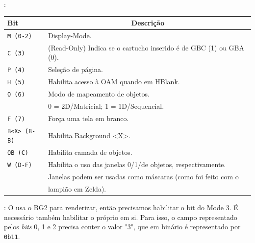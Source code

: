 \documentclass{beamer}
\let\emph\relax %
\begin{document}
\begin{darkframes}
\begin{frame}{\secname: \subsecname}
    \scriptsize{\begin{center}
        \begin{tabular}{|l|l|}
            \hline
            Bit & \multicolumn{1}{|c|}{Descrição} \\\hline
            \rowcolor[rgb]{.9,.6,.6}\texttt{M (0-2)} & Display-Mode. \\\hline
            \texttt{C (3)} & (Read-Only) Indica se o cartucho inserido é de GBC (1) ou GBA (0). \\\hline
            \texttt{P (4)} & Seleção de página. \\\hline
            \texttt{H (5)} & Habilita acesso à OAM quando em HBlank. \\\hline
            \texttt{O (6)} & Modo de mapeamento de objetos.\\
                           & 0 = 2D/Matricial; 1 = 1D/Sequencial. \\\hline
            \texttt{F (7)} & Força uma tela em branco. \\\hline
            \rowcolor{cyan}\texttt{B<X> (8-B)} & Habilita Background <X>. \\\hline
            \texttt{OB (C)} & Habilita camada de objetos. \\\hline
            \texttt{W (D-F)} & Habilita o uso das janelas 0/1/de objetos, respectivamente. \\
                             & Janelas podem ser usadas como máscaras (como foi feito com o \\
                             & lampião em Zelda). \\\hline
        \end{tabular}
    \end{center}}
\end{frame}

\begin{frame}{\secname: \subsecname}
    O \emph{Mode 3} usa o BG2 para renderizar, então precisamos habilitar o bit do Mode 3.
    É necessário também habilitar o próprio \emph{Mode 3} em si. Para isso,
    o campo representado pelos \textit{bits} 0, 1 e 2 precisa conter o valor "3",
    que em binário é representado por \texttt{0b11}.


\end{frame}
\end{darkframes}
\end{document}
